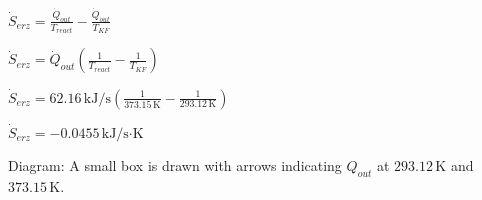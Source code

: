 \( \dot{S}_{erz} = \frac{\dot{Q}_{out}}{T_{react}} - \frac{\dot{Q}_{out}}{T_{KF}} \)  

\( \dot{S}_{erz} = \dot{Q}_{out} \left( \frac{1}{T_{react}} - \frac{1}{T_{KF}} \right) \)  

\( \dot{S}_{erz} = 62.16 \, \text{kJ/s} \left( \frac{1}{373.15 \, \text{K}} - \frac{1}{293.12 \, \text{K}} \right) \)  

\( \dot{S}_{erz} = -0.0455 \, \text{kJ/s·K} \)  

Diagram:  
A small box is drawn with arrows indicating \( Q_{out} \) at \( 293.12 \, \text{K} \) and \( 373.15 \, \text{K} \).